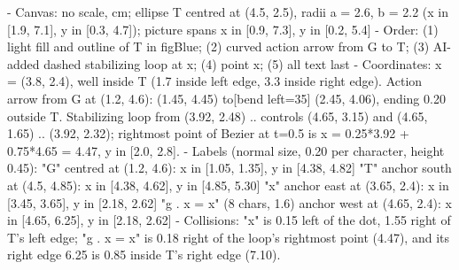 \begin{content}

\begin{hidden}
- Canvas: no scale, cm; ellipse T centred at (4.5, 2.5), radii a = 2.6, b = 2.2 (x in [1.9, 7.1], y in [0.3, 4.7]); picture spans x in [0.9, 7.3], y in [0.2, 5.4]
- Order: (1) light fill and outline of T in figBlue; (2) curved action arrow from G to T; (3) AI-added dashed stabilizing loop at x; (4) point x; (5) all text last
- Coordinates:
  x = (3.8, 2.4), well inside T (1.7 inside left edge, 3.3 inside right edge).
  Action arrow from G at (1.2, 4.6): (1.45, 4.45) to[bend left=35] (2.45, 4.06), ending 0.20 outside T.
  Stabilizing loop from (3.92, 2.48) .. controls (4.65, 3.15) and (4.65, 1.65) .. (3.92, 2.32); rightmost point of Bezier at t=0.5 is x = 0.25*3.92 + 0.75*4.65 = 4.47, y in [2.0, 2.8].
- Labels (normal size, 0.20 per character, height 0.45):
  "G" centred at (1.2, 4.6): x in [1.05, 1.35], y in [4.38, 4.82]
  "T" anchor south at (4.5, 4.85): x in [4.38, 4.62], y in [4.85, 5.30]
  "x" anchor east at (3.65, 2.4): x in [3.45, 3.65], y in [2.18, 2.62]
  "g . x = x" (8 chars, 1.6) anchor west at (4.65, 2.4): x in [4.65, 6.25], y in [2.18, 2.62]
- Collisions: "x" is 0.15 left of the dot, 1.55 right of T's left edge; "g . x = x" is 0.18 right of the loop's rightmost point (4.47), and its right edge 6.25 is 0.85 inside T's right edge (7.10).
\end{hidden}
\begin{center}
\end{center}
\end{content}
